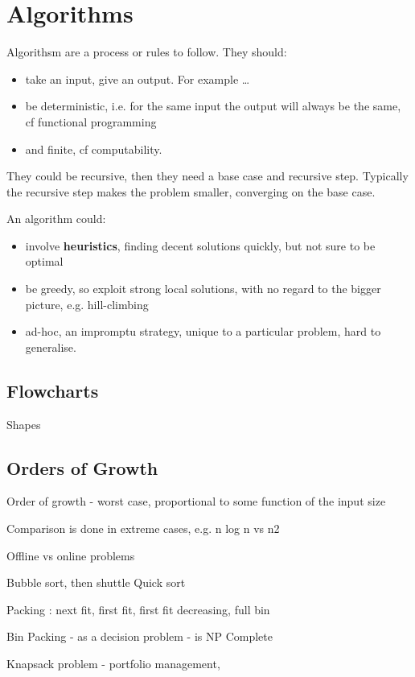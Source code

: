 \section{Algorithms}
\label{title}
Algorithsm are a process or rules to follow. They should:
\begin{itemize}
	\item take an input, give an output. For example \ldots 
	\item be deterministic, i.e. for the same input the output will always be the same, cf functional programming  
	\item and finite, cf computability. 
\end{itemize}

They could be recursive, then they need a base case and recursive step. Typically the recursive step makes the problem smaller, converging on the base case. 

An algorithm could:
\begin{itemize}
	\item involve \textbf{heuristics}, finding decent solutions quickly, but not sure to be optimal 
	\item be greedy, so exploit strong local solutions, with no regard to the bigger picture, e.g. hill-climbing 
	\item ad-hoc, an impromptu strategy, unique to a particular problem, hard to generalise.  
\end{itemize}

\subsection{Flowcharts}

Shapes

\subsection{Orders of Growth}

Order of growth - worst case, proportional to some function of the input size 

Comparison is done in extreme cases, e.g. n log n vs n2 

Offline vs online problems 

Bubble sort, then shuttle 
Quick sort 

Packing : next fit, first fit, first fit decreasing, full bin 

Bin Packing - as a decision problem - is NP Complete 

Knapsack problem  - portfolio management, 

